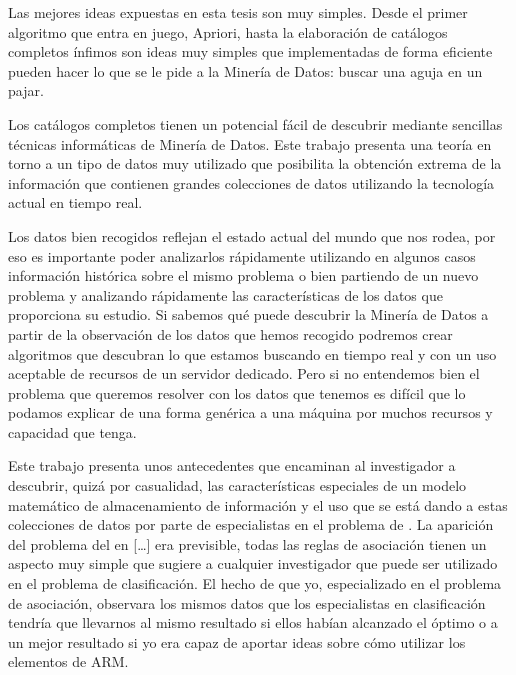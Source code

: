 \noindent Las mejores ideas expuestas en esta tesis son muy simples. Desde el primer algoritmo que entra en juego, Apriori, hasta la elaboración de catálogos completos ínfimos son ideas muy simples que implementadas de forma eficiente pueden hacer lo que se le pide a la Minería de Datos: buscar una aguja en un pajar.

Los catálogos completos tienen un potencial fácil de descubrir mediante sencillas técnicas informáticas de Minería de Datos. Este trabajo presenta una teoría en torno a un tipo de datos muy utilizado que posibilita la obtención extrema de la información que contienen grandes colecciones de datos utilizando la tecnología actual en tiempo real. 

Los datos bien recogidos reflejan el estado actual del mundo que nos rodea, por eso es importante poder analizarlos rápidamente utilizando en algunos casos información histórica sobre el mismo problema o bien partiendo de un nuevo problema y analizando rápidamente las características de los datos que proporciona su estudio. Si sabemos qué puede descubrir la Minería de Datos a partir de la observación de los datos que hemos recogido podremos crear algoritmos que descubran lo que estamos buscando en tiempo real y con un uso aceptable de recursos de un servidor dedicado. Pero si no entendemos bien el problema que queremos resolver con los datos que tenemos es difícil que lo podamos explicar de una forma genérica a una máquina por muchos recursos y capacidad que tenga.

Este trabajo presenta unos antecedentes que encaminan al investigador a descubrir, quizá por casualidad, las características especiales de un modelo matemático de almacenamiento de información y el uso que se está dando a estas colecciones de datos por parte de especialistas en el problema de \clasificacion. La aparición del problema del \carm en [\ldots] era previsible, todas las reglas de asociación tienen un aspecto muy simple que sugiere a cualquier investigador que puede ser utilizado en el problema de clasificación. El hecho de que yo, especializado en el problema de asociación, observara los mismos datos que los especialistas en clasificación tendría que llevarnos al mismo resultado si ellos habían alcanzado el óptimo o a un mejor resultado si yo era capaz de aportar ideas sobre cómo utilizar los elementos de ARM.

